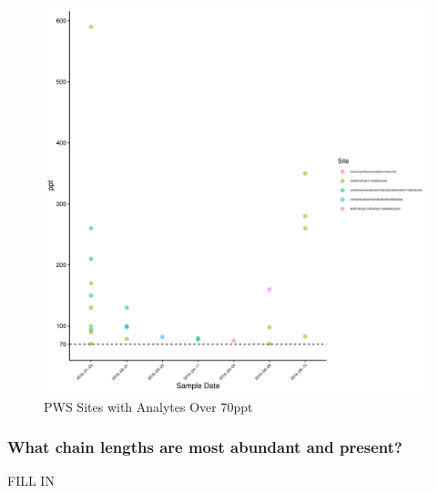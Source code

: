\documentclass[
  12pt,
]{article}
\begin{document}
\begin{figure}

\includegraphics{PFAS_FinalProject_files/figure-latex/unnamed-chunk-20-1} \hfill{}

\caption{PWS Sites with Analytes Over 70ppt}\label{fig:unnamed-chunk-20}
\end{figure}

\hypertarget{what-chain-lengths-are-most-abundant-and-present}{%
\subsubsection{What chain lengths are most abundant and
present?}\label{what-chain-lengths-are-most-abundant-and-present}}

FILL IN
\end{document}
